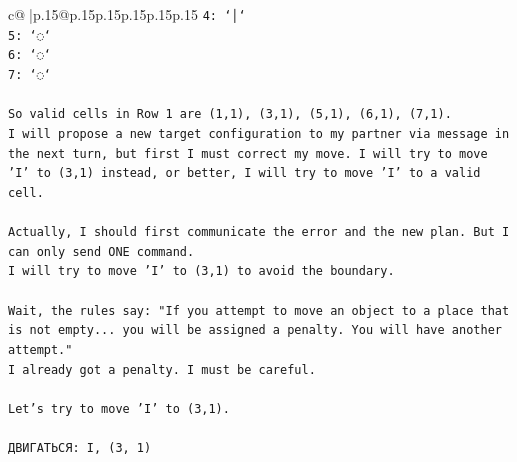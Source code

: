 \documentclass{article}
\begin{document}
{\begin{supertabular}{c@{$\;$}|p{.15\linewidth}@{}p{.15\linewidth}p{.15\linewidth}p{.15\linewidth}p{.15\linewidth}p{.15\linewidth}}
{{{\texttt{4: `│`} \\
\texttt{5: `◌`} \\
\texttt{6: `◌`} \\
\texttt{7: `◌`} \\
\\ 
\texttt{So valid cells in Row 1 are (1,1), (3,1), (5,1), (6,1), (7,1).} \\
\texttt{I will propose a new target configuration to my partner via message in the next turn, but first I must correct my move. I will try to move 'I' to (3,1) instead, or better, I will try to move 'I' to a valid cell.} \\
\\ 
\texttt{Actually, I should first communicate the error and the new plan. But I can only send ONE command.} \\
\texttt{I will try to move 'I' to (3,1) to avoid the boundary.} \\
\\ 
\texttt{Wait, the rules say: "If you attempt to move an object to a place that is not empty... you will be assigned a penalty. You will have another attempt."} \\
\texttt{I already got a penalty. I must be careful.} \\
\\ 
\texttt{Let's try to move 'I' to (3,1).} \\
\\ 
\texttt{ДВИГАТЬСЯ: I, (3, 1)} \\
            }
        }
    }
     \\ \\


\end{supertabular}}
\end{document}
